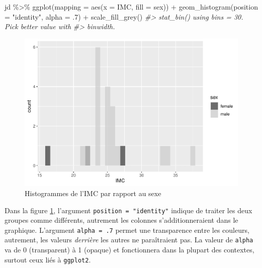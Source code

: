 \documentclass[
]{book}
\newenvironment{Shaded}{}{}
\newcommand{\AttributeTok}[1]{#1}
\newcommand{\CommentTok}[1]{\textit{#1}}
\newcommand{\DecValTok}[1]{#1}
\newcommand{\FunctionTok}[1]{#1}
\newcommand{\NormalTok}[1]{#1}
\newcommand{\SpecialCharTok}[1]{#1}
\newcommand{\StringTok}[1]{#1}
\begin{document}
\begin{Shaded}
\begin{Highlighting}[]
\NormalTok{jd }\SpecialCharTok{\%\textgreater{}\%} 
  \FunctionTok{ggplot}\NormalTok{(}\AttributeTok{mapping =} \FunctionTok{aes}\NormalTok{(}\AttributeTok{x =}\NormalTok{ IMC, }\AttributeTok{fill =}\NormalTok{ sex)) }\SpecialCharTok{+} 
  \FunctionTok{geom\_histogram}\NormalTok{(}\AttributeTok{position =} \StringTok{"identity"}\NormalTok{, }\AttributeTok{alpha =}\NormalTok{ .}\DecValTok{7}\NormalTok{) }\SpecialCharTok{+} 
  \FunctionTok{scale\_fill\_grey}\NormalTok{()}
\CommentTok{\#\textgreater{} \textasciigrave{}stat\_bin()\textasciigrave{} using \textasciigrave{}bins = 30\textasciigrave{}. Pick better value with}
\CommentTok{\#\textgreater{} \textasciigrave{}binwidth\textasciigrave{}.}
\end{Highlighting}
\end{Shaded}

\begin{figure}

{\centering \includegraphics[width=0.75\linewidth,height=0.75\textheight]{07-Visualiser_files/figure-latex/hist2-1} 

}

\caption{Histogrammes de l'IMC par rapport au sexe}\label{fig:hist2}
\end{figure}

Dans la figure \ref{fig:hist2}, l'argument \texttt{position\ =\ "identity"} indique de traiter les deux groupes comme différents, autrement les colonnes s'additionneraient dans le graphique. L'argument \texttt{alpha\ =\ .7} permet une transparence entre les couleurs, autrement, les valeurs \emph{derrière} les autres ne paraîtraient pas. La valeur de \texttt{alpha} va de 0 (transparent) à 1 (opaque) et fonctionnera dans la plupart des contextes, surtout ceux liés à \texttt{ggplot2}.
\end{document}
